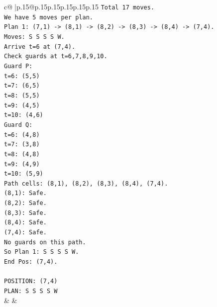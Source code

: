 \documentclass{article}
\begin{document}
{\begin{supertabular}{c@{$\;$}|p{.15\linewidth}@{}p{.15\linewidth}p{.15\linewidth}p{.15\linewidth}p{.15\linewidth}p{.15\linewidth}}
{{{\texttt{Total 17 moves.} \\
\texttt{We have 5 moves per plan.} \\
\texttt{Plan 1: (7,1) {-}> (8,1) {-}> (8,2) {-}> (8,3) {-}> (8,4) {-}> (7,4).} \\
\texttt{Moves: S S S S W.} \\
\texttt{Arrive t=6 at (7,4).} \\
\texttt{Check guards at t=6,7,8,9,10.} \\
\texttt{Guard P:} \\
\texttt{t=6: (5,5)} \\
\texttt{t=7: (6,5)} \\
\texttt{t=8: (5,5)} \\
\texttt{t=9: (4,5)} \\
\texttt{t=10: (4,6)} \\
\texttt{Guard Q:} \\
\texttt{t=6: (4,8)} \\
\texttt{t=7: (3,8)} \\
\texttt{t=8: (4,8)} \\
\texttt{t=9: (4,9)} \\
\texttt{t=10: (5,9)} \\
\texttt{Path cells: (8,1), (8,2), (8,3), (8,4), (7,4).} \\
\texttt{(8,1): Safe.} \\
\texttt{(8,2): Safe.} \\
\texttt{(8,3): Safe.} \\
\texttt{(8,4): Safe.} \\
\texttt{(7,4): Safe.} \\
\texttt{No guards on this path.} \\
\texttt{So Plan 1: S S S S W.} \\
\texttt{End Pos: (7,4).} \\
\\ 
\texttt{POSITION: (7,4)} \\
\texttt{PLAN: S S S S W} \\
            }
        }
    }
    & & \\ \\


\end{supertabular}}
\end{document}
